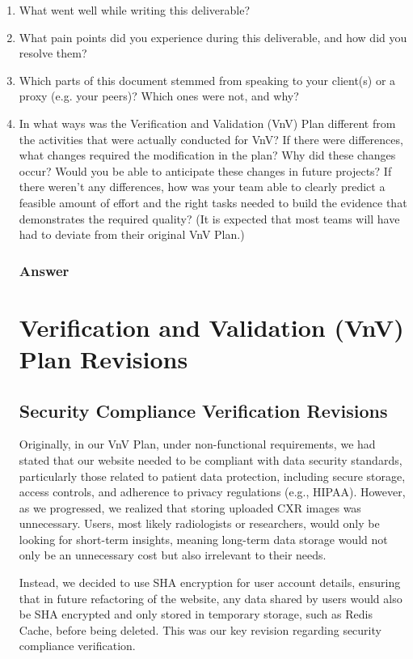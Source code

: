\documentclass[12pt, titlepage]{article}
\begin{document}
\begin{enumerate}
  \item What went well while writing this deliverable? 
  \item What pain points did you experience during this deliverable, and how
    did you resolve them?
  \item Which parts of this document stemmed from speaking to your client(s) or
  a proxy (e.g. your peers)? Which ones were not, and why?
  \item In what ways was the Verification and Validation (VnV) Plan different
  from the activities that were actually conducted for VnV?  If there were
  differences, what changes required the modification in the plan?  Why did
  these changes occur?  Would you be able to anticipate these changes in future
  projects?  If there weren't any differences, how was your team able to clearly
  predict a feasible amount of effort and the right tasks needed to build the
  evidence that demonstrates the required quality?  (It is expected that most
  teams will have had to deviate from their original VnV Plan.)


  \subsubsection{Answer}
  \section{Verification and Validation (VnV) Plan Revisions}

  \subsection{Security Compliance Verification Revisions}
  
  Originally, in our VnV Plan, under non-functional requirements, we had stated that our website needed to be compliant with data security standards, particularly those related to patient data protection, including secure storage, access controls, and adherence to privacy regulations (e.g., HIPAA). However, as we progressed, we realized that storing uploaded CXR images was unnecessary. Users, most likely radiologists or researchers, would only be looking for short-term insights, meaning long-term data storage would not only be an unnecessary cost but also irrelevant to their needs. 
  
  Instead, we decided to use SHA encryption for user account details, ensuring that in future refactoring of the website, any data shared by users would also be SHA encrypted and only stored in temporary storage, such as Redis Cache, before being deleted. This was our key revision regarding security compliance verification.


\end{enumerate}
\end{document}

